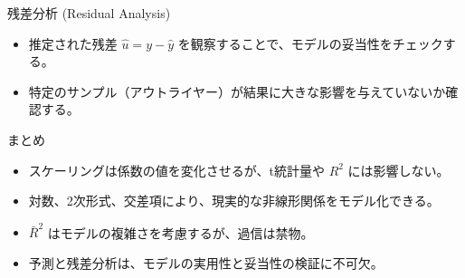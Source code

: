 \documentclass[
  ignorenonframetext,
]{beamer}
\providecommand{\tightlist}{%
  \setlength{\itemsep}{0pt}\setlength{\parskip}{0pt}}
\begin{document}
\begin{frame}{残差分析 (Residual Analysis)}
\protect\hypertarget{ux6b8bux5deeux5206ux6790-residual-analysis}{}
\begin{itemize}
\tightlist
\item
  推定された残差 \(\hat{u} = y - \hat{y}\)
  を観察することで、モデルの妥当性をチェックする。
\item
  特定のサンプル（アウトライヤー）が結果に大きな影響を与えていないか確認する。
\end{itemize}
\end{frame}

\begin{frame}{まとめ}
\protect\hypertarget{ux307eux3068ux3081}{}
\begin{itemize}
\tightlist
\item
  スケーリングは係数の値を変化させるが、t統計量や \(R^2\)
  には影響しない。
\item
  対数、2次形式、交差項により、現実的な非線形関係をモデル化できる。
\item
  \(\bar{R}^2\) はモデルの複雑さを考慮するが、過信は禁物。
\item
  予測と残差分析は、モデルの実用性と妥当性の検証に不可欠。
\end{itemize}
\end{frame}
\end{document}
